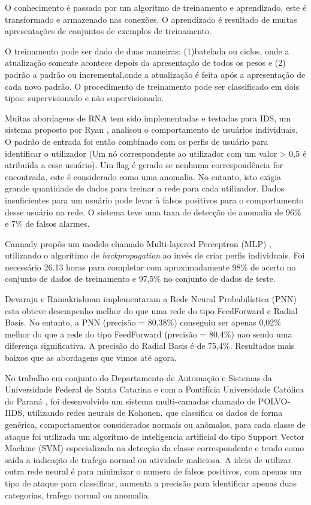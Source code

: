 O conhecimento é passado por um algoritmo de treinamento e aprendizado, este é transformado e armazenado nas conexões. 
O aprendizado é resultado de muitas apresentações de conjuntos de exemplos de treinamento.

O treinamento pode ser dado de duas maneiras: (1)batelada ou ciclos, onde a atualização somente acontece depois da apresentação de todos os pesos e (2) padrão a padrão ou incremental,onde a atualização é feita após a apresentação de cada novo padrão. O procedimento de treinamento pode ser classificado em dois tipos: supervisionado e não supervisionado.

Muitas abordagens de RNA tem sido implementadas e testadas para IDS, um sistema proposto por Ryan \cite{Ryan}, analisou  o comportamento de usuários individuais. O padrão de entrada foi então combinado com os perfis de usuário para identificar o utilizador (Um nó correspondente ao utilizador com um valor > 0,5 é atribuída a esse usuário). Um flag é gerado se nenhuma correspondência for encontrada,  este é considerado como uma anomalia. No entanto, isto exigia grande quantidade de dados para treinar a rede para cada utilizador. Dados insuficientes para um usuário pode levar à falsos positivos para o comportamento desse usuário na rede. O sistema teve uma taxa de detecção de anomalia de 96\% e 7\% de falsos alarmes.

Cannady propôs um modelo chamado Multi-layered Perceptron (MLP) \cite{Cannady}, utilizando o algorítimo de \textit{backpropagation} ao invés de criar perfis individuais. Foi necessário 26.13 horas para completar com aproximadamente 98\% de acerto no conjunto de dados de treinamento e 97,5\% no conjunto de dados de teste.

Devaraju e Ramakrishnan implementaram a  Rede Neural Probabilística (PNN) \cite{Devaraju} esta obteve desempenho melhor do que uma rede do tipo FeedForward e Radial Basis. No entanto, a PNN (precisão = 80,38\%) conseguiu ser apenas 0,02\% melhor do que a rede do tipo FeedForward (precisão = 80,4\%) nao sendo uma diferença significativa. A precisão do  Radial Basis é de 75,4\%.
Resultados mais baixos que as abordagens que vimos até agora.

No trabalho em conjunto do Departamento de Automação e Sistemas da Universidade Federal de Santa Catarina \cite{polvo1} e com a Pontifícia Universidade Católica do Paraná \cite{polvo2}, foi desenvolvido um sistema multi-camadas chamado de POLVO-IIDS, utilizando redes neurais de Kohonen, que classifica os dados de forma genérica, comportamentos considerados normais ou anômalos, para cada classe de ataque foi utilizada um algoritmo de inteligencia artificial do tipo Support Vector Machine (SVM) especializada na detecção da classe correspondente e tendo como saída a indicação de trafego normal ou atividade maliciosa.
A ideia de utilizar outra rede neural é para minimizar o numero de falsos positivos, com apenas um tipo de ataque para classificar, aumenta a precisão para identificar apenas duas categorias, trafego normal ou anomalia.

